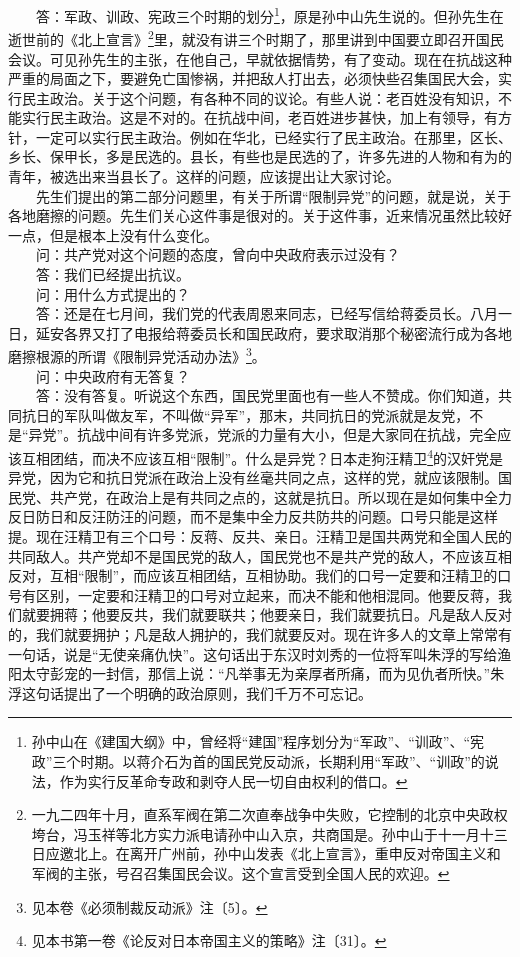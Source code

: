 \documentclass[cn,11pt,chinese]{elegantbook}
\begin{document}
　　答：军政、训政、宪政三个时期的划分\footnote[4]{ 孙中山在《建国大纲》中，曾经将“建国”程序划分为“军政”、“训政”、“宪政”三个时期。以蒋介石为首的国民党反动派，长期利用“军政”、“训政”的说法，作为实行反革命专政和剥夺人民一切自由权利的借口。}，原是孙中山先生说的。但孙先生在逝世前的《北上宣言》\footnote[5]{ 一九二四年十月，直系军阀在第二次直奉战争中失败，它控制的北京中央政权垮台，冯玉祥等北方实力派电请孙中山入京，共商国是。孙中山于十一月十三日应邀北上。在离开广州前，孙中山发表《北上宣言》，重申反对帝国主义和军阀的主张，号召召集国民会议。这个宣言受到全国人民的欢迎。}里，就没有讲三个时期了，那里讲到中国要立即召开国民会议。可见孙先生的主张，在他自己，早就依据情势，有了变动。现在在抗战这种严重的局面之下，要避免亡国惨祸，并把敌人打出去，必须快些召集国民大会，实行民主政治。关于这个问题，有各种不同的议论。有些人说：老百姓没有知识，不能实行民主政治。这是不对的。在抗战中间，老百姓进步甚快，加上有领导，有方针，一定可以实行民主政治。例如在华北，已经实行了民主政治。在那里，区长、乡长、保甲长，多是民选的。县长，有些也是民选的了，许多先进的人物和有为的青年，被选出来当县长了。这样的问题，应该提出让大家讨论。\\
　　先生们提出的第二部分问题里，有关于所谓“限制异党”的问题，就是说，关于各地磨擦的问题。先生们关心这件事是很对的。关于这件事，近来情况虽然比较好一点，但是根本上没有什么变化。\\
　　问：共产党对这个问题的态度，曾向中央政府表示过没有？\\
　　答：我们已经提出抗议。
\\
　　问：用什么方式提出的？\\
　　答：还是在七月间，我们党的代表周恩来同志，已经写信给蒋委员长。八月一日，延安各界又打了电报给蒋委员长和国民政府，要求取消那个秘密流行成为各地磨擦根源的所谓《限制异党活动办法》\footnote[6]{ 见本卷《必须制裁反动派》注〔5〕。}。\\
　　问：中央政府有无答复？\\
　　答：没有答复。听说这个东西，国民党里面也有一些人不赞成。你们知道，共同抗日的军队叫做友军，不叫做“异军”，那末，共同抗日的党派就是友党，不是“异党”。抗战中间有许多党派，党派的力量有大小，但是大家同在抗战，完全应该互相团结，而决不应该互相“限制”。什么是异党？日本走狗汪精卫\footnote[7]{ 见本书第一卷《论反对日本帝国主义的策略》注〔31〕。}的汉奸党是异党，因为它和抗日党派在政治上没有丝毫共同之点，这样的党，就应该限制。国民党、共产党，在政治上是有共同之点的，这就是抗日。所以现在是如何集中全力反日防日和反汪防汪的问题，而不是集中全力反共防共的问题。口号只能是这样提。现在汪精卫有三个口号：反蒋、反共、亲日。汪精卫是国共两党和全国人民的共同敌人。共产党却不是国民党的敌人，国民党也不是共产党的敌人，不应该互相反对，互相“限制”，而应该互相团结，互相协助。我们的口号一定要和汪精卫的口号有区别，一定要和汪精卫的口号对立起来，而决不能和他相混同。他要反蒋，我们就要拥蒋；他要反共，我们就要联共；他要亲日，我们就要抗日。凡是敌人反对的，我们就要拥护；凡是敌人拥护的，我们就要反对。现在许多人的文章上常常有一句话，说是“无使亲痛仇快”。这句话出于东汉时刘秀的一位将军叫朱浮的写给渔阳太守彭宠的一封信，那信上说：“凡举事无为亲厚者所痛，而为见仇者所快。”朱浮这句话提出了一个明确的政治原则，我们千万不可忘记。\\
\end{document}
